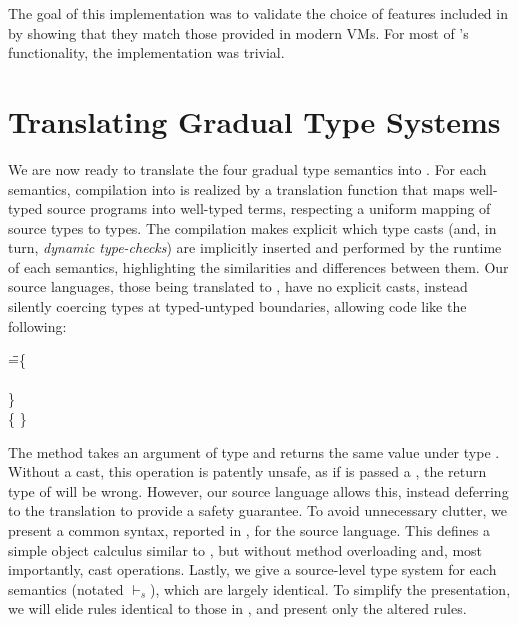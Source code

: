\documentclass[a4paper,USenglish]{tex/lipics-v2016}
\begin{document}
The goal of this implementation was to validate the choice of features
included in \kafka by showing that they match those provided in modern VMs.
For most of \kafka's functionality, the implementation was trivial. 


\section{Translating Gradual Type Systems}


\noindent
We are now ready to translate the four gradual type semantics into \kafka.
For each semantics, compilation into \kafka is realized by a translation
function that maps well-typed source programs into well-typed \kafka terms,
respecting a uniform mapping of source types to \kafka types.  The
compilation makes explicit which type casts (and, in turn, \emph{dynamic
  type-checks}) are implicitly inserted and performed by the runtime of each
semantics, highlighting the similarities and differences between them.  Our
source languages, those being translated to \kafka, have no explicit casts,
instead silently coercing types at typed-untyped boundaries, allowing code
like the following:

\begin{tabbing}
\hspace{1cm}\K\HS \Call{\New\C{}}\m{\New\D{}} \HS\HS\HS\WHERE\HS
  \K\HS =\HS \= \class\= \C \{\\
       \> \HS \Mdef\m\x\any\C{\HS\x\HS}\\
       \> \}  \\
       \>\class \D \{ \}
\end{tabbing}         

\noindent The method \m takes an argument of type \any and returns the same
value under type \C. Without a cast, this operation is patently unsafe, as
if \m is passed a \D, the return type of \m will be wrong. However, our
source language allows this, instead deferring to the translation to provide
a safety guarantee.  To avoid unnecessary clutter, we present a common
syntax, reported in , for the source language. This
defines a simple object calculus similar to \kafka, but without method
overloading and, most importantly, cast operations. Lastly, we give a
source-level type system for each semantics (notated $\vdash_{\!s}$), which
are largely identical. To simplify the presentation, we will elide rules
identical to those in \kafka, and present only the altered rules.
\end{document}
